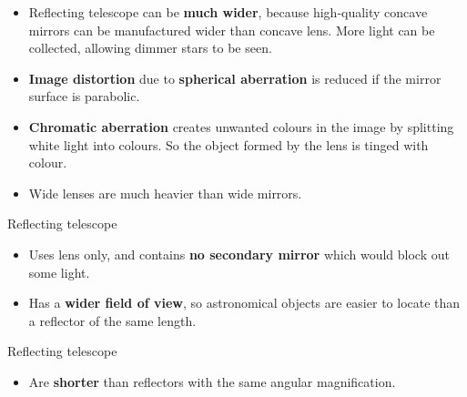 \begin{itemize}
    \item Reflecting telescope can be \textbf{much wider}, because high-quality concave mirrors can be manufactured wider than concave lens. More light can be collected, allowing dimmer stars to be seen.
    \item \textbf{Image distortion} due to \textbf{spherical aberration} is reduced if the mirror surface is parabolic.
    \item \textbf{Chromatic aberration} creates unwanted colours in the image by splitting white light into colours. So the object formed by the lens is tinged with colour.
    \item Wide lenses are much heavier than wide mirrors.
\end{itemize}

Reflecting telescope
\begin{itemize}
    \item Uses lens only, and contains \textbf{no secondary mirror} which would block out some light.
    \item Has a \textbf{wider field of view}, so astronomical objects are easier to locate than a reflector of the same length.
\end{itemize}

Reflecting telescope
\begin{itemize}
    \item Are \textbf{shorter} than reflectors with the same angular magnification.
\end{itemize}
